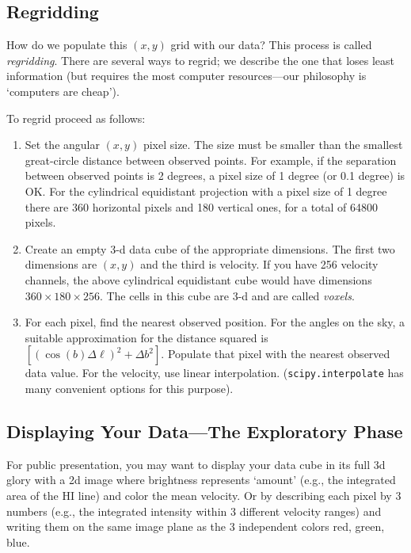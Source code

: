 \documentclass[psfig,preprint]{aastex}
\begin{document}
\subsection{Regridding}

\noindent
How do we populate this $(x,y)$ grid
with our data? This process is called {\it regridding}. There are
several ways to regrid; we describe the one that loses least
information (but requires the most computer resources---our
philosophy is `computers are cheap').

To regrid proceed as
follows: \begin{enumerate}

\item Set the angular $(x,y)$ pixel size. The size must be smaller than
  the smallest great-circle distance between observed points. For
  example, if the separation between observed points is 2 degrees, a
  pixel size of 1 degree (or 0.1 degree) is OK. For the cylindrical
  equidistant projection with a pixel size of 1 degree there are 360
  horizontal pixels and 180 vertical ones, for a total of 64800 pixels.

\item Create an empty 3-d data cube of the appropriate dimensions. The
  first two dimensions are $(x,y)$ and the third is velocity. If you
  have 256 velocity channels, the above cylindrical equidistant cube
  would have dimensions $360 \times 180 \times 256$. The cells in this
  cube are 3-d and are called {\it voxels}.

\item For each pixel, find the nearest observed position. For the angles
  on the sky, a suitable approximation for the distance squared is $[
    (\cos (b) \Delta \ell)^2 + \Delta b^2]$. Populate that pixel with
  the nearest observed data value. For the velocity, use linear
  interpolation.  ({\tt scipy.interpolate} has many convenient options for
  this purpose).

\end{enumerate}

\subsection{Displaying Your Data---The Exploratory Phase}

\noindent
For public presentation, you may want to display your data cube in its
full 3d glory with a 2d image where brightness represents `amount'
(e.g., the integrated area of the HI line) and color the mean
velocity. Or by describing each pixel by 3 numbers (e.g., the integrated
intensity within 3 different velocity ranges) and writing them on the
same image plane as the 3 independent colors red, green, blue.
\end{document}

